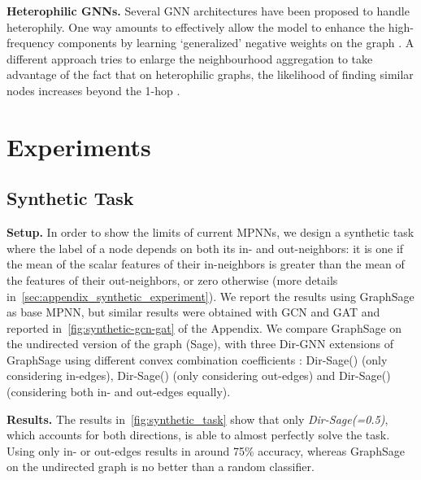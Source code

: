 \documentclass{article}
\newcommand\oursacro{Dir-GNN}
\theoremstyle{plain}
\theoremstyle{definition}
\theoremstyle{remark}
\begin{document}
\textbf{Heterophilic GNNs.}
Several GNN architectures have been proposed to handle heterophily. One way amounts to effectively allow the model to enhance the high-frequency components by learning `generalized' negative weights on the graph \cite{chien2020adaptive,bo2021beyond,luan2022revisiting,bodnar2022neural,di2022graph}.  
A different approach tries to enlarge the neighbourhood aggregation to take advantage of the fact that on heterophilic graphs, the likelihood of finding similar nodes increases beyond the 1-hop \cite{abu-el-haijaMixHopHigherOrderGraph2019,zhu2020beyond,lim2021large,maurya2021improving,li2022finding}.
 \section{Experiments} \label{sec:experiments}

\subsection{Synthetic Task} \label{sec:synthetic_experiments}

\textbf{Setup.} In order to show the limits of current MPNNs, we design a synthetic task where the label of a node depends on both its in- and out-neighbors: it is one if the mean of the scalar features of their in-neighbors is greater than the mean of the features of their out-neighbors, or zero otherwise (more details in~\cref{sec:appendix_synthetic_experiment}). We report the results using GraphSage as base MPNN, but similar results were obtained with GCN and GAT and reported in~\cref{fig:synthetic-gcn-gat} of the Appendix. We compare GraphSage on the undirected version of the graph (Sage), with three \oursacro{} extensions of GraphSage using different convex combination coefficients : Dir-Sage() (only considering in-edges), Dir-Sage() (only considering out-edges) and Dir-Sage() (considering both in- and out-edges equally).

\textbf{Results.} The results in~\cref{fig:synthetic_task} show that only \textit{Dir-Sage(=0.5)}, which accounts for both directions, is able to almost perfectly solve the task. Using only in- or out-edges results in around 75\% accuracy, whereas GraphSage on the undirected graph is no better than a random classifier. 
\end{document}
